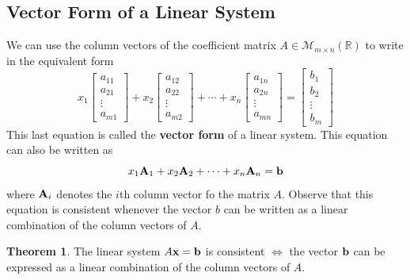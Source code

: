 \documentclass{article}
\renewcommand{\bf}[1]{\textbf{#1}}
\theoremstyle{definition}
\newtheorem{theorem}{Theorem}
\newcommand{\reals}{\mathbb{R}}
\newcommand{\letmatrix}[2]{\mathcal{M}_{#1 \times #2}(\reals)}
\newcommand{\bmat}[1]{\begin{bmatrix}#1\end{bmatrix}}
\begin{document}
\subsection{Vector Form of a Linear System}
We can use the column vectors of the coefficient matrix $A \in \letmatrix{m}{n}$ to write in the equivalent form
\[ x_1\bmat{a_{11}\\a_{21}\\\vdots\\a_{m1}} + x_2\bmat{a_{12}\\a_{22}\\\vdots\\a_{m2}} + \cdots + x_n\bmat{a_{1n}\\a_{2n}\\\vdots\\a_{mn}} = \bmat{b_1\\b_2\\\vdots\\b_m}\]
This last equation is called the \bf{vector form} of a linear system. This equation can also be written as
\[ x_1\vb{A}_1 + x_2\vb{A}_2 + \cdots + x_n\vb{A}_n = \vb{b} \]
where $\vb{A}_i$ denotes the $i$th column vector fo the matrix $A$. Observe that this equation is consistent whenever the vector $b$ can be written as a linear combination of the column vectors of $A$.
\begin{theorem}
	The linear system $A\vb{x = b}$ is consistent $\iff$ the vector $\vb{b}$ can be expressed as a linear combination of the column vectors of $A$. 
\end{theorem}
\end{document}
